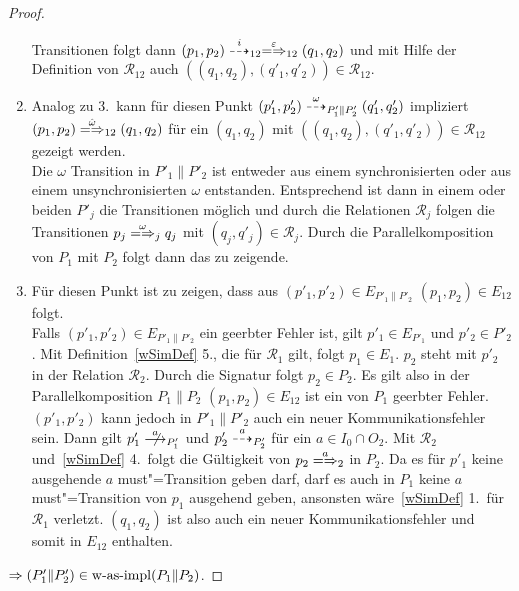 \begin{proof}
\begin{enumerate}
      Transitionen folgt dann $(p_1,p_2) \may[i]_{12} \weakmay[\varepsilon]_{12}
      (q_1,q_2)$ und mit Hilfe der Definition von $\mathcal{R}_{12}$ auch
      $((q_1,q_2),(q'_1,q'_2))\in\mathcal{R}_{12}$.
    \item Analog zu 3.\ kann für diesen Punkt
      $(p'_1,p'_2)\may[\omega]_{P'_1\|P'_2}(q'_1,q'_2)$ impliziert $(p_1,p_2)
      \weakmay[\hat{\omega}]_{12} (q_1,q_2)$ für ein $(q_1,q_2)$ mit
      $((q_1,q_2),(q'_1,q'_2))\in\mathcal{R}_{12}$ gezeigt werden.\\
      Die $\omega$ Transition in $P'_1\|P'_2$ ist entweder aus einem
      synchronisierten oder aus einem unsynchronisierten $\omega$ entstanden.
      Entsprechend ist dann in einem oder beiden $P'_j$ die Transitionen
      möglich und durch die Relationen $\mathcal{R}_j$ folgen die Transitionen
      $p_j \weakmay[\omega]_j q_j$ mit $(q_j,q'_j)\in\mathcal{R}_j$. Durch
      die Parallelkomposition von $P_1$ mit $P_2$ folgt dann das zu zeigende.
    \item Für diesen Punkt ist zu zeigen, dass aus $(p'_1,p'_2)\in
      E_{P'_1\|P'_2}$ $(p_1,p_2)\in E_{12}$ folgt.\\
      Falls $(p'_1,p'_2)\in E_{P'_1\|P'_2}$ ein geerbter Fehler ist, gilt
      \oBdA{} $p'_1\in E_{P'_1}$ und $p'_2\in P'_2$. Mit
      Definition~\ref{wSimDef} 5., die für $\mathcal{R}_1$ gilt, folgt $p_1\in
      E_1$. $p_2$ steht mit $p'_2$ in der Relation $\mathcal{R}_2$. Durch die
      Signatur folgt $p_2\in P_2$. Es gilt also in der Parallelkomposition
      $P_1\|P_2$ $(p_1,p_2)\in E_{12}$ ist ein von $P_1$ geerbter Fehler.
      $(p'_1,p'_2)$ kann jedoch in $P'_1\|P'_2$ auch ein neuer
      Kommunikationsfehler sein. Dann gilt \oBdA{} $p'_1\nmust[a]_{P'_1}$ und
      $p'_2\may[a]_{P'_2}$ für ein $a\in I_0\cap O_2$. Mit $\mathcal{R}_2$
      und~\ref{wSimDef} 4.\ folgt die Gültigkeit von $p_2\weakmay[a]_2$ in
      $P_2$. Da es für $p'_1$ keine ausgehende $a$ must"=Transition geben darf,
      darf es auch in $P_1$ keine $a$ must"=Transition von $p_1$ ausgehend geben,
      ansonsten wäre~\ref{wSimDef} 1.\ für $\mathcal{R}_1$ verletzt.
      $(q_1,q_2)$ ist also auch ein neuer Kommunikationsfehler und somit in
      $E_{12}$ enthalten.
  \end{enumerate}
  $\Rightarrow (P'_1\|P'_2)\in\mathrm{w}\text{-}\mathrm{as}\text{-}\mathrm{impl} (P_1\|P_2)$.
\end{proof}


